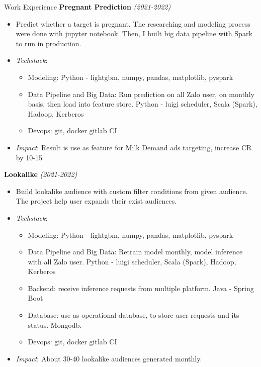 \documentclass{resume} %
\begin{document}
\begin{rSection}{Work Experience}
\textbf{Pregnant Prediction } \textit{(2021-2022)}
\begin{itemize}
    \item Predict whether a target is pregnant. The researching and modeling process were done with jupyter notebook. Then, I built big data pipeline with Spark to run in production.
    \item \textit{Techstack}:
    \begin{itemize}
        \item Modeling: Python - lightgbm, numpy, pandas, matplotlib, pyspark
        \item Data Pipeline and Big Data: Run prediction on all Zalo user, on monthly basis, then load into feature store. Python - luigi scheduler, Scala (Spark), Hadoop, Kerberos
        \item Devops: git, docker gitlab CI
    \end{itemize} 
    \item \textit{Impact}: Result is use as feature for Milk Demand ads targeting, increase CR by 10-15%
\end{itemize}

\textbf{Lookalike} \textit{(2021-2022)}
\begin{itemize}
    \item Build lookalike audience with custom filter conditions from given audience. The project help user expands their exist audiences.
    \item \textit{Techstack}:
    \begin{itemize}
        \item Modeling: Python - lightgbm, numpy, pandas, matplotlib, pyspark
        \item Data Pipeline and Big Data: Retrain model monthly,  model inference with all Zalo user. Python - luigi scheduler, Scala (Spark), Hadoop, Kerberos
        \item Backend: receive inference requests from multiple platform. Java - Spring Boot
        \item Database: use as operational database, to store user requests and its status. Mongodb.
        \item Devops: git, docker gitlab CI
    \end{itemize} 
    \item \textit{Impact}: About 30-40 lookalike audiences generated monthly.
\end{itemize}



\end{rSection}
\end{document}
